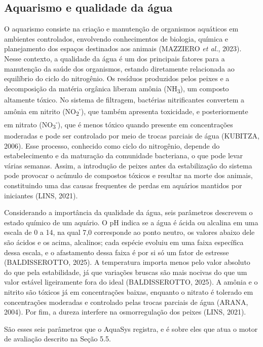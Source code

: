 \documentclass[12pt,oneside,a4paper,brazilian]{abntex2}
\begin{document}
\subsection{Aquarismo e qualidade da água}
O aquarismo consiste na criação e manutenção de organismos aquáticos em ambientes controlados, envolvendo conhecimentos de biologia, química e planejamento dos espaços destinados aos animais (MAZZIERO \textit{et al.}, 2023). Nesse contexto, a qualidade da água é um dos principais fatores para a manutenção da saúde dos organismos, estando diretamente relacionada ao equilíbrio do ciclo do nitrogênio. Os resíduos produzidos pelos peixes e a decomposição da matéria orgânica liberam amônia (NH\textsubscript{3}), um composto altamente tóxico. No sistema de filtragem, bactérias nitrificantes convertem a amônia em nitrito (NO\textsubscript{2}\textsuperscript{-}), que também apresenta toxicidade, e posteriormente em nitrato (NO\textsubscript{3}\textsuperscript{-}), que é menos tóxico quando presente em concentrações moderadas e pode ser controlado por meio de trocas parciais de água (KUBITZA, 2006). Esse processo, conhecido como ciclo do nitrogênio, depende do estabelecimento e da maturação da comunidade bacteriana, o que pode levar várias semanas. Assim, a introdução de peixes antes da estabilização do sistema pode provocar o acúmulo de compostos tóxicos e resultar na morte dos animais, constituindo uma das causas frequentes de perdas em aquários mantidos por iniciantes (LINS, 2021).

Considerando a importância da qualidade da água, seis parâmetros descrevem o estado químico de um aquário. O pH indica se a água é ácida ou alcalina em uma escala de 0 a 14, na qual 7,0 corresponde ao ponto neutro, os valores abaixo dele são ácidos e os acima, alcalinos; cada espécie evoluiu em uma faixa específica dessa escala, e o afastamento dessa faixa é por si só um fator de estresse (BALDISSEROTTO, 2025). A temperatura importa menos pelo valor absoluto do que pela estabilidade, já que variações bruscas são mais nocivas do que um valor estável ligeiramente fora do ideal (BALDISSEROTTO, 2025). A amônia e o nitrito são tóxicos já em concentrações baixas, enquanto o nitrato é tolerado em concentrações moderadas e controlado pelas trocas parciais de água (ARANA, 2004). Por fim, a dureza interfere na osmorregulação dos peixes (LINS, 2021).

São esses seis parâmetros que o AquaSys registra, e é sobre eles que atua o motor de avaliação descrito na Seção 5.5.
\end{document}
